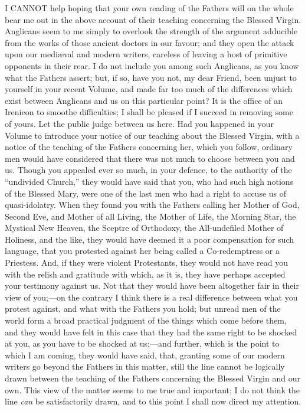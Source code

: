 I CANNOT help hoping that your own reading of the Fathers will
on the whole bear me out in the above account of their teaching
concerning the Blessed Virgin. Anglicans seem to me simply to overlook
the strength of the argument adducible from the works of those ancient
doctors in our favour; and they open the attack upon our mediæval and
modern writers, careless of leaving a host of primitive opponents in
their rear. I do not include you among such Anglicans, as you know what
the Fathers assert; but, if so, have you not, my dear Friend, been
unjust to yourself in your recent Volume, and made far too much of the
differences which exist between Anglicans and us on this particular
point? It is the office of an Irenicon to smoothe difficulties; I shall
be pleased if I succeed in removing some of yours. Let the public judge
between us here. Had you happened in your Volume to introduce your
notice of our teaching about the Blessed Virgin, with a notice of the
teaching of the Fathers concerning her, which you follow, ordinary men
would have considered that there was not much to choose between you and
us. Though you appealed ever so much, in your defence, to the authority
of the ``undivided Church,'' they would have said that you,
who had such high notions of the Blessed Mary, were one of the last men
who had a right to accuse us of quasi-idolatry. When they found you with
the Fathers calling her Mother of God, Second Eve, and Mother of all
Living, the Mother of Life, the Morning Star, the Mystical New Heaven,
the Sceptre of Orthodoxy, the All-undefiled Mother of Holiness, and the
like, they would have deemed it a poor compensation for such language,
that you protested against her being called a Co-redemptress or a
Priestess. And, if they were violent Protestants, they would not have
read you with the relish and gratitude with which, as it is, they have
perhaps accepted your testimony against us. Not that they would have
been altogether fair in their view of you;—on the contrary I think
there is a real difference between what you protest against, and what
with the Fathers you hold; but unread men of the world form a broad
practical judgment of the things which come before them, and they would
have felt in this case that they had the same right to be shocked at
you, as you have to be shocked at us;—and further, which is the point
to which I am coming, they would have said, that, granting some of our
modern writers go beyond the Fathers in this matter, still the line
cannot be logically drawn between the teaching of the Fathers concerning
the Blessed Virgin and our own. This view of the matter seems to me true
and important; I do not think the line \emph{can} be satisfactorily
drawn, and to this point I shall now direct my attention.

